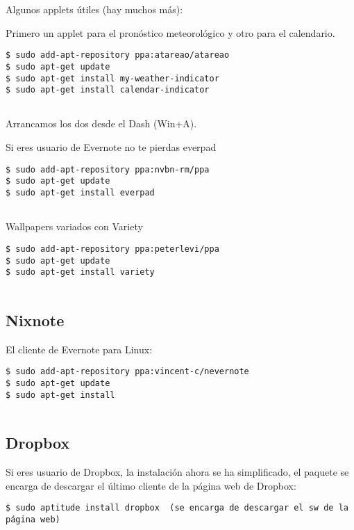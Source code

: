 Algunos applets útiles (hay muchos más):

Primero un applet para el pronóstico meteorológico y otro para el
calendario.

\begin{verbatim}
$ sudo add-apt-repository ppa:atareao/atareao
$ sudo apt-get update
$ sudo apt-get install my-weather-indicator
$ sudo apt-get install calendar-indicator
      
\end{verbatim}

Arrancamos los dos desde el Dash (Win+A).

Si eres usuario de Evernote no te pierdas everpad

\begin{verbatim}
$ sudo add-apt-repository ppa:nvbn-rm/ppa
$ sudo apt-get update
$ sudo apt-get install everpad
      
\end{verbatim}

Wallpapers variados con Variety

\begin{verbatim}
$ sudo add-apt-repository ppa:peterlevi/ppa
$ sudo apt-get update
$ sudo apt-get install variety
      
\end{verbatim}

\subsection{Nixnote}\label{nixnote}

El cliente de Evernote para Linux:

\begin{verbatim}
$ sudo add-apt-repository ppa:vincent-c/nevernote
$ sudo apt-get update
$ sudo apt-get install
      
\end{verbatim}

\subsection{Dropbox}\label{dropbox}

Si eres usuario de Dropbox, la instalación ahora se ha simplificado, el
paquete se encarga de descargar el último cliente de la página web de
Dropbox:

\begin{verbatim}
$ sudo aptitude install dropbox  (se encarga de descargar el sw de la página web)
        
\end{verbatim}

